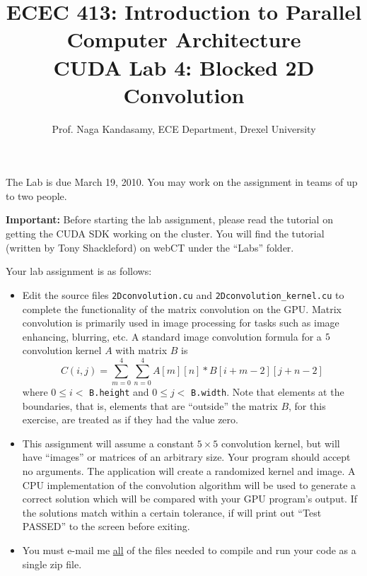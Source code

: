\documentclass[11.5pt]{article}
\begin{document}
\newcommand{\captionfonts}{\bf}{\small}
\makeatletter  %
\long\def\@makecaption#1#2{%
  \vskip\abovecaptionskip
  \sbox\@tempboxa{{\captionfonts #1: #2}}%
  \ifdim \wd\@tempboxa >\hsize
    {\captionfonts #1: #2\par}
  \else
    \hbox to\hsize{\hfil\box\@tempboxa\hfil}%
  \fi
  \vskip\belowcaptionskip}
\makeatother   %
\renewcommand{\figurename}{Fig.} %

\title{ECEC 413: Introduction to Parallel Computer Architecture \\ CUDA Lab 4: Blocked 2D Convolution}
\author{Prof. Naga Kandasamy, ECE Department, Drexel University}
\maketitle %
\date{}

\noindent The Lab is due March 19, 2010. You may work on the assignment in teams of up to two people.
\vspace{12pt}

\noindent \textbf{Important:} Before starting the lab assignment, please read the tutorial on getting the CUDA SDK working on the cluster. You will find the tutorial (written by Tony Shackleford) on webCT under the ``Labs'' folder. \vspace{24pt}

\noindent Your lab assignment is as follows:
\begin{itemize}
\item Edit the source files \texttt{2Dconvolution.cu} and \texttt{2Dconvolution\_kernel.cu} to complete the functionality of the matrix convolution on the GPU. Matrix convolution is primarily used in image processing for tasks such as image enhancing, blurring, etc.  A standard image convolution formula for a $5 \time 5$ convolution kernel $A$ with matrix $B$ is
    \begin{equation*}
	C(i,j) = \sum_{m = 0}^4 \sum_{n = 0}^4 A[m][n] * B[i+m-2][j+n-2]
	\end{equation*}
    \noindent where $0 \leq i <$ \texttt{B.height} and $0 \leq j <$ \texttt{B.width}. Note that elements at the boundaries, that is, elements that are ``outside'' the matrix $B$, for this exercise, are treated as if they had the value zero.

\item This assignment will assume a constant $5 \times 5$ convolution kernel, but will have ``images'' or matrices of an arbitrary size. Your program should accept no arguments. The application will create a randomized kernel and image.
    A CPU implementation of the convolution algorithm will be used to generate a correct solution which will be compared with your GPU program's output. If the solutions match within a certain tolerance, if will print out ``Test PASSED''
    to the screen before exiting.

\item You must e-mail me \underline{all} of the files needed to compile and run your code as a single zip file.
\end{itemize}
\vspace{12pt}
\end{document}
